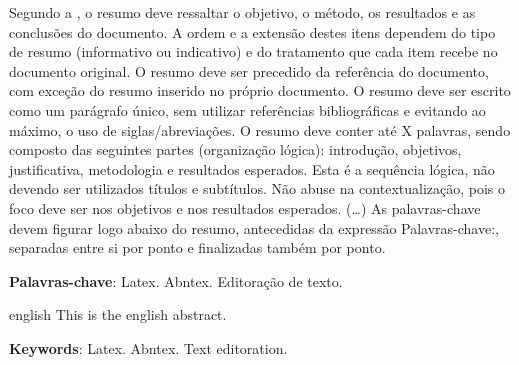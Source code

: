\setlength{\absparsep}{18pt} %
\begin{resumo}
 Segundo a , o resumo deve ressaltar o
 objetivo, o método, os resultados e as conclusões do documento. A ordem e a extensão
 destes itens dependem do tipo de resumo (informativo ou indicativo) e do
 tratamento que cada item recebe no documento original. O resumo deve ser
 precedido da referência do documento, com exceção do resumo inserido no
 próprio documento. O resumo deve ser escrito como um parágrafo único, sem utilizar referências bibliográficas e evitando ao máximo, o uso de siglas/abreviações. O resumo deve conter até X palavras, sendo composto das seguintes partes (organização lógica): introdução, objetivos, justificativa, metodologia e resultados esperados. Esta é a sequência lógica, não devendo ser utilizados títulos e subtítulos. Não abuse na contextualização, pois o foco deve ser nos objetivos e nos resultados esperados. (\ldots) As palavras-chave devem figurar logo abaixo do
 resumo, antecedidas da expressão Palavras-chave:, separadas entre si por
 ponto e finalizadas também por ponto.

\textbf{Palavras-chave}: Latex. Abntex. Editoração de texto.
\end{resumo}

\begin{resumo}[Abstract]
 \begin{otherlanguage*}{english}
   This is the english abstract.

   \vspace{\onelineskip}
 
   \noindent 
   \textbf{Keywords}: Latex. Abntex. Text editoration.
 \end{otherlanguage*}
\end{resumo}
